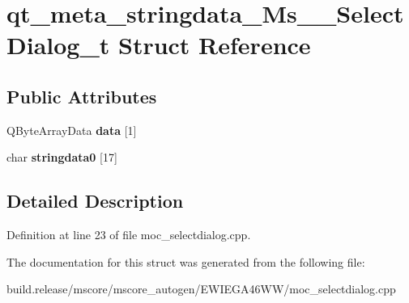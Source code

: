 \hypertarget{structqt__meta__stringdata___ms_____select_dialog__t}{}\section{qt\+\_\+meta\+\_\+stringdata\+\_\+\+Ms\+\_\+\+\_\+\+Select\+Dialog\+\_\+t Struct Reference}
\label{structqt__meta__stringdata___ms_____select_dialog__t}
\subsection*{Public Attributes}
\begin{DoxyCompactItemize}
\item 
\mbox{\label{structqt__meta__stringdata___ms_____select_dialog__t_ad494b4eb850ef495629302f24f2df31c}} 
Q\+Byte\+Array\+Data {\bfseries data} \mbox{[}1\mbox{]}
\item 
\mbox{\label{structqt__meta__stringdata___ms_____select_dialog__t_af549eb4ee400d1d7c0802bba1650f3fc}} 
char {\bfseries stringdata0} \mbox{[}17\mbox{]}
\end{DoxyCompactItemize}


\subsection{Detailed Description}


Definition at line 23 of file moc\+\_\+selectdialog.\+cpp.



The documentation for this struct was generated from the following file\+:\begin{DoxyCompactItemize}
\item 
build.\+release/mscore/mscore\+\_\+autogen/\+E\+W\+I\+E\+G\+A46\+W\+W/moc\+\_\+selectdialog.\+cpp\end{DoxyCompactItemize}
